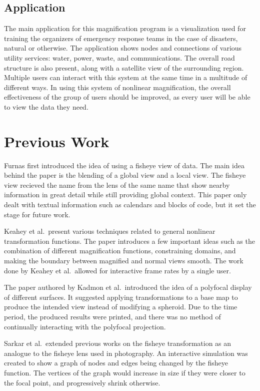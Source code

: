 \documentclass[annual]{acmsiggraph}
\begin{document}
\subsection{Application}
The main application for this magnification program is a visualization used
for training the organizers of emergency response teams in the case of
disasters, natural or otherwise. The application shows nodes and connections
of various utility services: water, power, waste, and communications. The 
overall road structure is also present, along with a satellite view of the
surrounding region. Multiple users can interact with this system at the same
time in a multitude of different ways. In using this system of nonlinear
magnification, the overall effectiveness of the group of users should be
improved, as every user will be able to view the data they need. 

\section{Previous Work}
Furnas first introduced the idea of using a fisheye view of data. The main idea
behind the paper is the blending of a global view and a local view. The fisheye
view recieved the name from the lens of the same name that show nearby information
in great detail while still providing global context. This paper only dealt
with textual information such as calendars and blocks of code, but it set the
stage for future work.\cite{f86}

Keahey et al.\ present various techniques related to general nonlinear 
transformation functions. The paper introduces a few important ideas
such as the combination of different magnification functions, constraining
domains, and making the boundary between magnified and normal views smooth.
The work done by Keahey et al.\ allowed for interactive frame rates by a 
single user. \cite{kr96}

The paper authored by Kadmon et al.\ introduced the idea of a polyfocal
display of different surfaces. It suggested applying transformations to
a base map to produce the intended view instead of modifying a spheroid.
Due to the time period, the produced results were printed, and there was
no method of continually interacting with the polyfocal projection.\cite{ks78}

Sarkar et al.\ extended previous works on the fisheye transformation as an
analogue to the fisheye lens used in photography. An interactive simulation
was created to show a graph of nodes and edges being changed by the fisheye
function. The vertices of the graph would increase in size if they were closer
to the focal point, and progressively shrink otherwise. \cite{sb92}
\end{document}

